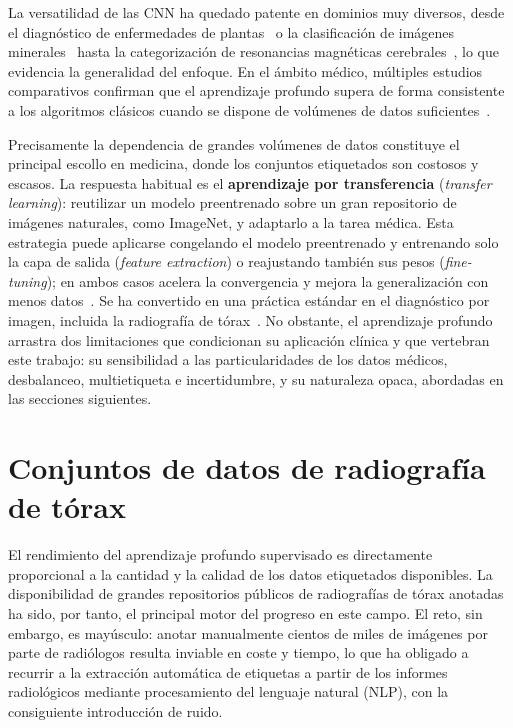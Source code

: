 La versatilidad de las CNN ha quedado patente en dominios muy diversos, desde el
diagnóstico de enfermedades de plantas~\cite{sharmaPlantDiseaseDiagnosis2022} o
la clasificación de imágenes minerales~\cite{liuEfficientImageSegmentation2021}
hasta la categorización de resonancias magnéticas
cerebrales~\cite{krishnapriyaPretrainedDeepLearning2023}, lo que evidencia la
generalidad del enfoque. En el ámbito médico, múltiples estudios comparativos
confirman que el aprendizaje profundo supera de forma consistente a los
algoritmos clásicos cuando se dispone de volúmenes de datos
suficientes~\cite{wangComparativeAnalysisImage2021, sharmaDeepLearningModels2022,
bharadiyaConvolutionalNeuralNetworks2023}.

Precisamente la dependencia de grandes volúmenes de datos constituye el principal
escollo en medicina, donde los conjuntos etiquetados son costosos y escasos. La
respuesta habitual es el \textbf{aprendizaje por transferencia} (\textit{transfer
learning}): reutilizar un modelo preentrenado sobre un gran repositorio de
imágenes naturales, como ImageNet, y adaptarlo a la tarea médica. Esta estrategia
puede aplicarse congelando el modelo preentrenado y entrenando solo la capa de
salida (\textit{feature extraction}) o reajustando también sus pesos
(\textit{fine-tuning}); en ambos casos acelera la convergencia y mejora la
generalización con menos datos~\cite{plestedDeepTransferLearning2026}. Se ha
convertido en una práctica estándar en el diagnóstico por imagen, incluida la
radiografía de tórax~\cite{jenaArtificialIntelligenceBased2021, kermanyIdentifyingMedical2018}.
No obstante, el aprendizaje profundo arrastra dos limitaciones que condicionan su
aplicación clínica y que vertebran este trabajo: su sensibilidad a las
particularidades de los datos médicos, desbalanceo, multietiqueta e
incertidumbre, y su naturaleza opaca, abordadas en las secciones siguientes.


\section{Conjuntos de datos de radiografía de tórax}
\label{sec::ec_datasets}

El rendimiento del aprendizaje profundo supervisado es directamente proporcional
a la cantidad y la calidad de los datos etiquetados disponibles. La disponibilidad
de grandes repositorios públicos de radiografías de tórax anotadas ha sido, por
tanto, el principal motor del progreso en este campo. El reto, sin embargo, es
mayúsculo: anotar manualmente cientos de miles de imágenes por parte de
radiólogos resulta inviable en coste y tiempo, lo que ha obligado a recurrir a la
extracción automática de etiquetas a partir de los informes radiológicos mediante
procesamiento del lenguaje natural (NLP), con la consiguiente introducción de
ruido.

